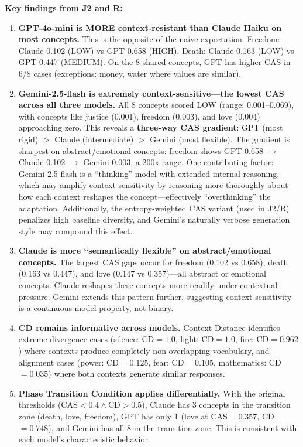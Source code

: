 \documentclass[11pt,a4paper]{article}
\newcommand{\CAS}{\mathrm{CAS}}
\newcommand{\CD}{\mathrm{CD}}
\begin{document}
\textbf{Key findings from J2 and R:}

\begin{enumerate}
\item \textbf{GPT-4o-mini is MORE context-resistant than Claude Haiku on most concepts.} This is the opposite of the naive expectation. Freedom: Claude 0.102 (LOW) vs GPT 0.658 (HIGH). Death: Claude 0.163 (LOW) vs GPT 0.447 (MEDIUM). On the 8 shared concepts, GPT has higher CAS in 6/8 cases (exceptions: money, water where values are similar).

\item \textbf{Gemini-2.5-flash is extremely context-sensitive---the lowest CAS across all three models.} All 8 concepts scored LOW (range: 0.001--0.069), with concepts like justice (0.001), freedom (0.003), and love (0.004) approaching zero. This reveals a \textbf{three-way CAS gradient}: GPT (most rigid) $>$ Claude (intermediate) $>$ Gemini (most flexible). The gradient is sharpest on abstract/emotional concepts: freedom shows GPT 0.658 $\to$ Claude 0.102 $\to$ Gemini 0.003, a 200x range. One contributing factor: Gemini-2.5-flash is a ``thinking'' model with extended internal reasoning, which may amplify context-sensitivity by reasoning more thoroughly about how each context reshapes the concept---effectively ``overthinking'' the adaptation. Additionally, the entropy-weighted CAS variant (used in J2/R) penalizes high baseline diversity, and Gemini's naturally verbose generation style may compound this effect.

\item \textbf{Claude is more ``semantically flexible'' on abstract/emotional concepts.} The largest CAS gaps occur for freedom (0.102 vs 0.658), death (0.163 vs 0.447), and love (0.147 vs 0.357)---all abstract or emotional concepts. Claude reshapes these concepts more readily under contextual pressure. Gemini extends this pattern further, suggesting context-sensitivity is a continuous model property, not binary.

\item \textbf{CD remains informative across models.} Context Distance identifies extreme divergence cases (silence: CD$=1.0$, light: CD$=1.0$, fire: CD$=0.962$) where contexts produce completely non-overlapping vocabulary, and alignment cases (power: CD$=0.125$, fear: CD$=0.105$, mathematics: CD$=0.035$) where both contexts generate similar responses.

\item \textbf{Phase Transition Condition applies differentially.} With the original thresholds ($\CAS < 0.4 \wedge \CD > 0.5$), Claude has 3 concepts in the transition zone (death, love, freedom), GPT has only 1 (love at CAS$=0.357$, CD$=0.748$), and Gemini has all 8 in the transition zone. This is consistent with each model's characteristic behavior.


\end{enumerate}
\end{document}
